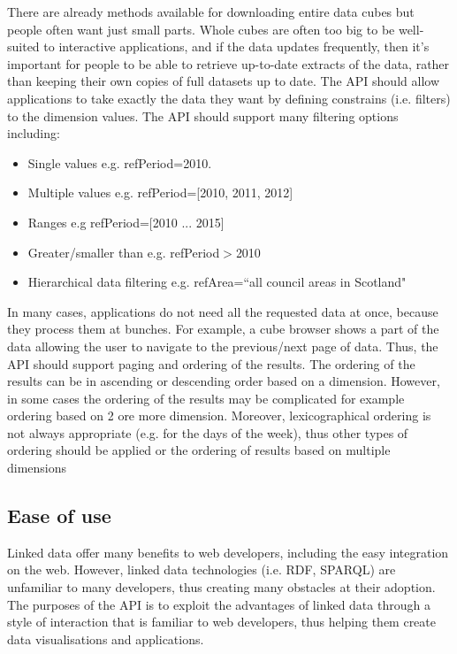 \documentclass{llncs}
\begin{document}
There are already methods available for downloading entire data cubes but people often want just small parts.  Whole cubes are often too big to be well-suited to interactive applications, and if the data updates frequently,  then it's important for people to be able to retrieve up-to-date extracts of the data, rather than keeping their own copies of full datasets up to date. The API should allow applications to take exactly the data they want by defining constrains (i.e. filters) to the dimension values. The API should support many filtering options including:
\begin{itemize}
\item Single values e.g. refPeriod=2010.
\item Multiple values e.g. refPeriod=[2010, 2011, 2012]
\item Ranges e.g refPeriod=[2010 ... 2015]
\item Greater/smaller than e.g. refPeriod$>$2010
\item Hierarchical data filtering e.g. refArea=``all council areas in Scotland"
\end{itemize}

In many cases, applications do not need all the requested data at once, because they process them at bunches. For example, a cube browser shows a part of the data allowing the user to navigate to the previous/next page of data. Thus, the API should support paging and ordering of the results. The ordering of the results can be in ascending or descending order based on a dimension. However, in some cases the ordering of the results may be complicated for example ordering based on 2 ore more dimension. Moreover, lexicographical ordering is not always appropriate (e.g. for the days of the week), thus other types of ordering should be applied or the ordering of results based on multiple dimensions



\subsection{Ease of use}

Linked data offer many benefits to web developers, including the easy integration on the web. However, linked data technologies (i.e. RDF, SPARQL) are unfamiliar to many developers, thus creating many obstacles at their adoption. The purposes of the API is to exploit the advantages of linked data through a style of interaction that is familiar to web developers, thus helping them create data visualisations and applications.
\end{document}
